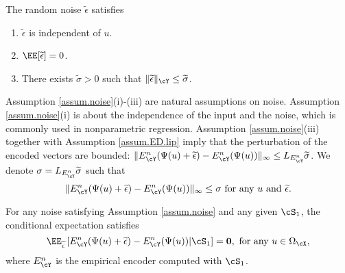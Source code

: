 \documentclass[11pt]{article} %
\begin{document}



\begin{assumption}[Noise]\label{assum.noise}
	The random noise $\widetilde{\epsilon}$ satisfies 	\begin{enumerate}[label=(\roman*)]
		\item $\widetilde{\epsilon}$ is independent of $u$.
		\item $\EE[\widetilde{\epsilon}]=0$.
		\item  There exists $\widetilde{\sigma}>0$ such that $\|\widetilde{\epsilon}\|_{\cY}\leq \widetilde{\sigma}$.
	\end{enumerate}
\end{assumption}

Assumption \ref{assum.noise}(i)-(iii) are natural assumptions on noise. Assumption \ref{assum.noise}(i) is about the independence of the input and the noise, which is commonly used in nonparametric regression.
Assumption \ref{assum.noise}(iii) together with Assumption \ref{assum.ED.lip} imply that the perturbation of the encoded vectors are bounded: $\|E^n_{\cY}(\Psi(u)+\widetilde{\epsilon})-E^n_{\cY}(\Psi(u))\|_{\infty}\leq L_{E^n_{\cY}}\widetilde{\sigma}$.  We denote $\sigma=L_{E^n_{\cY}}\widetilde{\sigma}$ such that $$\|E^n_{\cY}(\Psi(u)+\widetilde{\epsilon})-E^n_{\cY}(\Psi(u))\|_{\infty}\le \sigma \text{ for any } u \text{ and } \widetilde{\epsilon}.$$ 

\begin{assumption}\label{assum.noiseEncoder}
	For any noise satisfying Assumption \ref{assum.noise} and any given $\cS_1$, the conditional expectation satisfies 
	$$\EE_{\widetilde{\epsilon}}\left[E^n_{\cY}(\Psi(u)+\widetilde{\epsilon})-E^n_{\cY}(\Psi(u))|\cS_1\right]=\mathbf{0}, \text{ for any}\ u\in \Omega_{\cX},$$
	where   
	$E^n_{\cY}$ is the empirical encoder computed with $\cS_1$.
\end{assumption}
\end{document}
